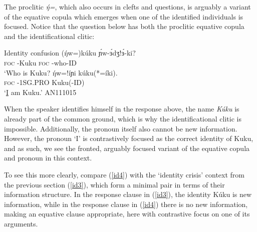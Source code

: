 The proclitic \textit{ŋ́=}, which also occurs in clefts and questions, is arguably a variant of the equative copula which emerges when one of the identified individuals is focused. Notice that the question below has both the proclitic equative copula and the identificational clitic:

\ea Identity confusion\label{id4}
	 \gll (ŋ́w=)kúku ɲ́w-ɜ́dʒ!ɜ́-ki?	\\
				 \textsc{foc} -Kuku  \textsc{foc} -who-ID\\
			\glt ‘Who is Kuku?
	 \gll ŋ́w=!íɲi kúku(*=íki).	\\
					 \textsc{foc} -1SG.PRO Kuku(-ID)\\
			\glt ‘\underline{I} am Kuku.' \hfill AN111015
\z

When the speaker identifies himself in the response above, the name \textit{Kúku} is already part of the common ground, which is why the identificational clitic is impossible. Additionally, the pronoun itself also cannot be new information. However, the pronoun `I' is contrastively focused as the correct identity of Kuku, and as such, we see the fronted, arguably focused variant of the equative copula and pronoun in this context.

To see this more clearly, compare (\ref{id4}) with the `identity crisis' context from the previous section (\ref{id3}), which form a minimal pair in terms of their information structure. In the response clause in (\ref{id3}), the identity Kúku is new information, while in the response clause in (\ref{id4}) there is no new information, making an equative clause appropriate, here with contrastive focus on one of its arguments. 
